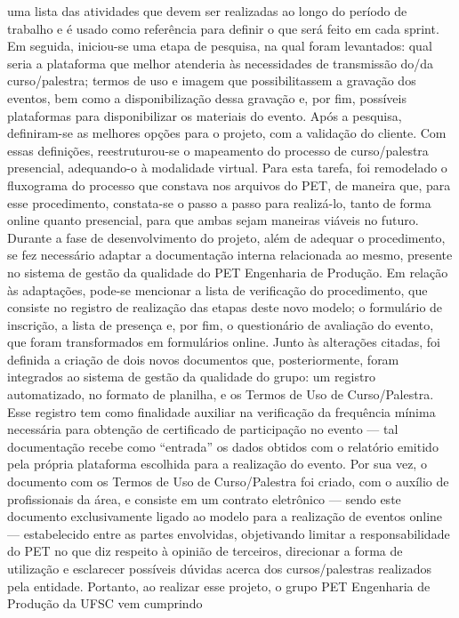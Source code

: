 uma lista das atividades que devem ser realizadas ao longo do período de trabalho e é usado como 
referência para definir o que será feito em cada sprint. Em seguida, iniciou-se uma etapa de 
pesquisa, na qual foram levantados: qual seria a plataforma que melhor atenderia às necessidades 
de transmissão do/da curso/palestra; termos de uso e imagem que possibilitassem a gravação dos 
eventos, bem como a disponibilização dessa gravação e, por fim, possíveis plataformas para 
disponibilizar os materiais do evento.
Após a pesquisa, definiram-se as melhores opções para o projeto, com a validação do cliente. Com 
essas definições, reestruturou-se o mapeamento do processo de curso/palestra presencial, 
adequando-o à modalidade virtual. Para esta tarefa, foi remodelado o fluxograma do processo que 
constava nos arquivos do PET, de maneira que, para esse procedimento, constata-se o passo a 
passo para realizá-lo, tanto de forma online quanto presencial, para que ambas sejam maneiras 
viáveis no futuro.
Durante a fase de desenvolvimento do projeto, além de adequar o procedimento, se fez necessário 
adaptar a documentação interna relacionada ao mesmo, presente no sistema de gestão da qualidade 
do PET Engenharia de Produção. Em relação às adaptações, pode-se mencionar a lista de 
verificação do procedimento, que consiste no registro de realização das etapas deste novo modelo; 
o formulário de inscrição, a lista de presença e, por fim, o questionário de avaliação do evento, 
que foram transformados em formulários online. Junto às alterações citadas, foi definida a criação 
de dois novos documentos que, posteriormente, foram integrados ao sistema de gestão da 
qualidade do grupo: um registro automatizado, no formato de planilha, e os Termos de Uso de 
Curso/Palestra. Esse registro tem como finalidade auxiliar na verificação da frequência mínima 
necessária para obtenção de certificado de participação no evento — tal documentação recebe 
como “entrada” os dados obtidos com o relatório emitido pela própria plataforma escolhida para a 
realização do evento. Por sua vez, o documento com os Termos de Uso de Curso/Palestra foi 
criado, com o auxílio de profissionais da área, e consiste em um contrato eletrônico — sendo este 
documento exclusivamente ligado ao modelo para a realização de eventos online — estabelecido 
entre as partes envolvidas, objetivando limitar a responsabilidade do PET no que diz respeito à 
opinião de terceiros, direcionar a forma de utilização e esclarecer possíveis dúvidas acerca dos 
cursos/palestras realizados pela entidade.
Portanto, ao realizar esse projeto, o grupo PET Engenharia de Produção da UFSC vem cumprindo 
